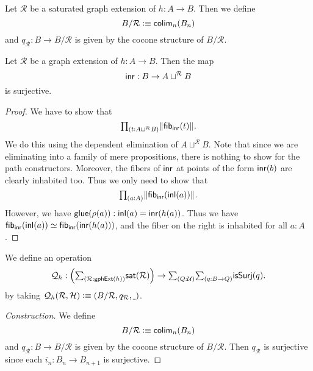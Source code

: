 \begin{defn}
Let $\mathcal{R}$ be a saturated graph extension of $h:A\to B$. Then we define
\begin{equation*}
B/\mathcal{R}\vcentcolon\equiv \mathsf{colim}_n(B_n)
\end{equation*}
and $q_\mathcal{R}:B\to B/\mathcal{R}$ is given by the cocone structure of $B/\mathcal{R}$.
\end{defn}

\begin{lem}
Let $\mathcal{R}$ be a graph extension of $h:A\to B$. Then the map
\begin{equation*}
{\mathsf{inr}} : B\to A\sqcup^{\mathcal{R}} B
\end{equation*}
is surjective.
\end{lem}

\begin{proof}
We have to show that 
\begin{equation*}
\prd{t:A\sqcup^{\mathcal{R}} B} \brck{\fib{\inr}{t}}.
\end{equation*}
We do this using the dependent elimination of $A\sqcup^{\mathcal{R}} B$.
Note that since we are eliminating into a family of mere propositions, there is nothing to show for the path constructors.
Moreover, the fibers of ${\mathsf{inr}}$ at points of the form ${\mathsf{inr}}(b)$ are clearly inhabited too.
Thus we only need to show that
\begin{equation*}
\prd{a:A}\brck{\fib{\inr}{\inl(a)}}.
\end{equation*}
However, we have $\mathsf{glue}(\rho(a)):{\mathsf{inl}}(a)={\mathsf{inr}}(h(a))$. Thus we have $\mathsf{fib}_{{\mathsf{inr}}}({\mathsf{inl}}(a))\simeq \mathsf{fib}_{{\mathsf{inr}}}({\mathsf{inr}}(h(a)))$, and the fiber on the right is inhabited for all $a:A$.
\end{proof}

\begin{defn}
We define an operation
\begin{equation*}
\mathcal{Q}_h : \Big(\sm{\mathcal{R}:\mathsf{gphExt}(h)}\mathsf{sat}(\mathcal{R})\Big)\to \sm{Q:\UU}{q:B\to Q}\mathsf{isSurj}(q).
\end{equation*}
by taking $\mathcal{Q}_h(\mathcal{R},\mathcal{H})\vcentcolon\equiv{\mathopen{}(B/\mathcal{R},q_\mathcal{R},\underline{\ }{})\mathclose{}}$.
\end{defn}

\begin{proof}[Construction]
We define
\begin{equation*}
B/\mathcal{R}\vcentcolon\equiv \mathsf{colim}_n(B_n)
\end{equation*}
and $q_\mathcal{R}:B\to B/\mathcal{R}$ is given by the cocone structure of $B/\mathcal{R}$. Then $q_{\mathcal{R}}$ is surjective since each $i_n:B_n\to B_{n+1}$ is surjective.
\end{proof}


